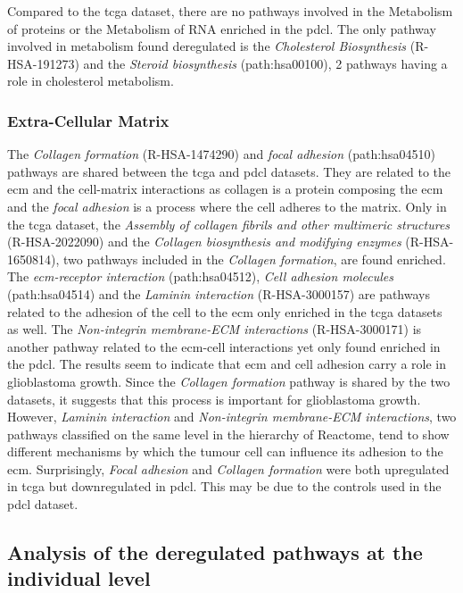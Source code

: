 Compared to the \acrshort{tcga} dataset, there are no pathways involved in the Metabolism of proteins or the Metabolism of RNA enriched in the \acrshort{pdcl}.
The only pathway involved in metabolism found deregulated is the \textit{Cholesterol Biosynthesis} (R-HSA-191273) and the \textit{Steroid biosynthesis} (path:hsa00100), 2 pathways having a role in cholesterol metabolism.

\subsubsection{Extra-Cellular Matrix}

The \textit{Collagen formation} (R-HSA-1474290) and \textit{focal adhesion} (path:hsa04510) pathways are shared between the \acrshort{tcga} and \acrshort{pdcl} datasets.
They are related to the \acrlong{ecm} and the cell-matrix interactions as collagen is a protein composing the \acrshort{ecm} and the \textit{focal adhesion} is a process where the cell adheres to the matrix.
Only in the \acrshort{tcga} dataset, the \textit{Assembly of collagen fibrils and other multimeric structures} (R-HSA-2022090) and the \textit{Collagen biosynthesis and modifying enzymes} (R-HSA-1650814), two pathways included in the \textit{Collagen formation}, are found enriched.
The \textit{\acrshort{ecm}-receptor interaction} (path:hsa04512), \textit{Cell adhesion molecules} (path:hsa04514) and the \textit{Laminin interaction} (R-HSA-3000157) are pathways related to the adhesion of the cell to the \acrshort{ecm} only enriched in the \acrshort{tcga} datasets as well.
The \textit{Non-integrin membrane-ECM interactions} (R-HSA-3000171) is another pathway related to the \acrshort{ecm}-cell interactions yet only found enriched in the \acrshort{pdcl}.
The results seem to indicate that \acrshort{ecm} and cell adhesion carry a role in glioblastoma growth.
Since the \textit{Collagen formation} pathway is shared by the two datasets, it suggests that this process is important for glioblastoma growth.
However, \textit{Laminin interaction} and \textit{Non-integrin membrane-ECM interactions}, two pathways classified on the same level in the hierarchy of Reactome, tend to show different mechanisms by which the tumour cell can influence its adhesion to the \acrshort{ecm}.
Surprisingly, \textit{Focal adhesion} and \textit{Collagen formation} were both upregulated in \acrshort{tcga} but downregulated in \acrshort{pdcl}.
This may be due to the controls used in the \acrshort{pdcl} dataset.

\subsection{Analysis of the deregulated pathways at the individual level}

